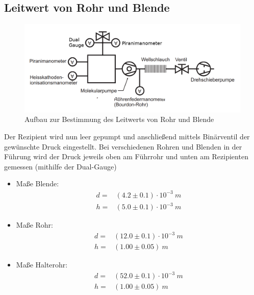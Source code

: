 \documentclass[12pt, a4paper]{scrartcl}
\begin{document}
    \subsection{Leitwert von Rohr und Blende}
    
        \begin{figure}[H]
            \centering
            \includegraphics[width=.55\paperwidth]{aufbau24.png}
            \caption{Aufbau zur Bestimmung des Leitwerts von Rohr und Blende}
            \label{fig:anord5}
        \end{figure}
    
    	Der Rezipient wird nun leer gepumpt und anschließend mittels Binärventil der gewünschte Druck eingestellt. Bei verschiedenen Rohren und Blenden in der Führung wird der Druck jeweils oben am Führrohr und unten am Rezipienten gemessen (mithilfe der Dual-Gauge)
    	
    	\begin{itemize}
    		\item Maße Blende:
    			\begin{align*}
    				d=&(4.2\pm 0.1)\cdot 10^{-3}\ m\\
    				h=&(5.0\pm 0.1)\cdot 10^{-3}\ m
    			\end{align*}
    			
    		\item Maße Rohr:
    			\begin{align*}
    				d=&(12.0\pm 0.1)\cdot 10^{-3}\ m\\
    				h=&(1.00\pm 0.05)\ m
    			\end{align*}
    			
    		\item Maße Halterohr:
    			\begin{align*}
    				d=&(52.0\pm 0.1)\cdot 10^{-3}\ m\\
    				h=&(1.00\pm 0.05)\ m
    			\end{align*}
    	\end{itemize}
    
\end{document}
